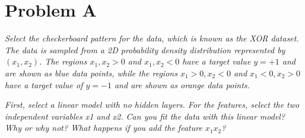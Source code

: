 \section*{Problem A}\label{sec:introduction}


\textit{Select the checkerboard pattern for the data, which is known as the XOR dataset. The data is sampled from a 2D probability density distribution represented by $(x_1, x_2)$. The regions $x_1, x_2 > 0$ and $x_1, x_2 < 0$ have a target value $y = +1$ and are shown as blue data points, while the regions $x_1 > 0, x_2 < 0$ and $x_1 < 0, x_2 > 0$ have a target value of $y = -1$ and are shown as orange data points.}

\textit{First, select a linear model with no hidden layers. For the features, select the two independent variables x1 and x2. Can you fit the data with this linear model? Why or why not? What happens if you add the feature $x_1x_2$?}


